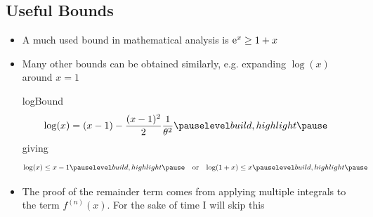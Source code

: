 \begin{slide}
\section[-2]{Useful Bounds}

\begin{PauseHighLight}
  \begin{itemize}
  \item A much used bound in mathematical analysis is ${\rm e}^{x} \geq 1 + x$\pause
  \item Many other bounds can be obtained similarly\pause,
    e.g. expanding $\log(x)$ around $x=1$\\
    \begin{rightImage}[0.3]{logBound}
        \begin{align*}
          \log(x) &= (x-1) - \frac{(x-1)^2}{2} \frac{1}{\theta^2}\pauseb
        \end{align*}
        giving
        \begin{align*}
          \log(x) &\leq x-1\pauseb &&\text{or} & \log(1+x) &\leq x\pauseb
        \end{align*}
    \end{rightImage}\pause
  \item The proof of the remainder term comes from applying
    multiple integrals to the term $f^{(n)}(x)$\pauseb. For the sake
    of time I will skip this\pauseb     
  \end{itemize}
\end{PauseHighLight}

\end{slide}

\Outline %

